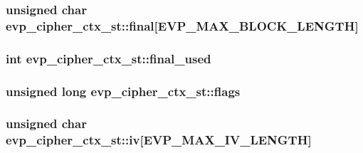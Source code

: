 \subsubsection[{\texorpdfstring{final}{final}}]{\setlength{\rightskip}{0pt plus 5cm}unsigned char evp\+\_\+cipher\+\_\+ctx\+\_\+st\+::final\mbox{[}{\bf E\+V\+P\+\_\+\+M\+A\+X\+\_\+\+B\+L\+O\+C\+K\+\_\+\+L\+E\+N\+G\+TH}\mbox{]}}\hypertarget{structevp__cipher__ctx__st_afe49879d0b4707382a3477ebb4eda55b}{}\label{structevp__cipher__ctx__st_afe49879d0b4707382a3477ebb4eda55b}
\subsubsection[{\texorpdfstring{final\+\_\+used}{final_used}}]{\setlength{\rightskip}{0pt plus 5cm}int evp\+\_\+cipher\+\_\+ctx\+\_\+st\+::final\+\_\+used}\hypertarget{structevp__cipher__ctx__st_a3cc687900b93b8cc130b52b0d5d9a836}{}\label{structevp__cipher__ctx__st_a3cc687900b93b8cc130b52b0d5d9a836}
\subsubsection[{\texorpdfstring{flags}{flags}}]{\setlength{\rightskip}{0pt plus 5cm}unsigned long evp\+\_\+cipher\+\_\+ctx\+\_\+st\+::flags}\hypertarget{structevp__cipher__ctx__st_acc3a9b3a3e5a7ca498e3f5817ffc533f}{}\label{structevp__cipher__ctx__st_acc3a9b3a3e5a7ca498e3f5817ffc533f}
\subsubsection[{\texorpdfstring{iv}{iv}}]{\setlength{\rightskip}{0pt plus 5cm}unsigned char evp\+\_\+cipher\+\_\+ctx\+\_\+st\+::iv\mbox{[}{\bf E\+V\+P\+\_\+\+M\+A\+X\+\_\+\+I\+V\+\_\+\+L\+E\+N\+G\+TH}\mbox{]}}\hypertarget{structevp__cipher__ctx__st_a1b3aa9f85ae704113077fb77b5c9db8b}{}\label{structevp__cipher__ctx__st_a1b3aa9f85ae704113077fb77b5c9db8b}
